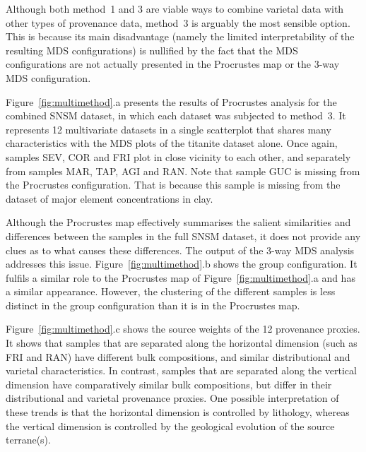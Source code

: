 \documentclass{article}
\begin{document}
Although both method~1 and 3 are viable ways to combine varietal data
with other types of provenance data, method~3 is arguably the most
sensible option. This is because its main disadvantage (namely the
limited interpretability of the resulting MDS configurations) is
nullified by the fact that the MDS configurations are not actually
presented in the Procrustes map or the 3-way MDS
configuration.\medskip

Figure~\ref{fig:multimethod}.a presents the results of Procrustes
analysis for the combined SNSM dataset, in which each dataset was
subjected to method~3. It represents 12 multivariate datasets in a
single scatterplot that shares many characteristics with the MDS plots
of the titanite dataset alone. Once again, samples SEV, COR and FRI
plot in close vicinity to each other, and separately from samples MAR,
TAP, AGI and RAN. Note that sample GUC is missing from the Procrustes
configuration. That is because this sample is missing from the dataset
of major element concentrations in clay.\medskip

Although the Procrustes map effectively summarises the salient
similarities and differences between the samples in the full SNSM
dataset, it does not provide any clues as to what causes these
differences. The output of the 3-way MDS analysis addresses this
issue.  Figure~\ref{fig:multimethod}.b shows the group
configuration. It fulfils a similar role to the Procrustes map of
Figure~\ref{fig:multimethod}.a and has a similar appearance.  However,
the clustering of the different samples is less distinct in the group
configuration than it is in the Procrustes map.\medskip

Figure~\ref{fig:multimethod}.c shows the source weights of the 12
provenance proxies. It shows that samples that are separated along the
horizontal dimension (such as FRI and RAN) have different bulk
compositions, and similar distributional and varietal
characteristics. In contrast, samples that are separated along the
vertical dimension have comparatively similar bulk compositions, but
differ in their distributional and varietal provenance proxies.  One
possible interpretation of these trends is that the horizontal
dimension is controlled by lithology, whereas the vertical dimension
is controlled by the geological evolution of the source
terrane(s).
\end{document}
